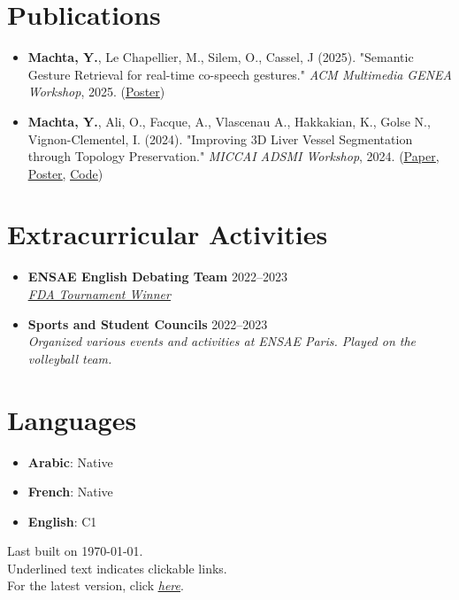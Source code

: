 \documentclass[letterpaper,11pt,twocolumn]{article}
\newcommand{\resumeItem}[1]{\item \small{#1}}
\newcommand{\resumeSubheading}[4]{
	\vspace{-2pt}\item \textbf{#1} \hfill #2 \\
	\textit{\small #3} \hfill \textit{\small #4} 
	\vspace{-7pt}
}
\begin{document}
\section{Publications}
\begin{itemize}[leftmargin=*]
    \resumeItem{\textbf{Machta, Y.}, Le Chapellier, M., Silem, O., Cassel, J (2025). "Semantic Gesture Retrieval for real-time co-speech gestures." \textit{ACM Multimedia GENEA Workshop}, 2025. (\href{https://MachtaYassine.github.io/Papers/GENEA2025-PosterDraft-YMACHTA-ARTICULAB.pdf}{\underline{Poster}})}

	\resumeItem{\textbf{Machta, Y.}, Ali, O., Facque, A., Vlascenau A., Hakkakian, K., Golse N., Vignon-Clementel, I. (2024). "Improving 3D Liver Vessel Segmentation through Topology Preservation." \textit{MICCAI ADSMI Workshop}, 2024. (\href{https://arxiv.org/abs/2411.15778}{\underline{Paper}}, \href{https://MachtaYassine.github.io/Papers/2024_ADSMI_poster.pdf}{\underline{Poster}}, \underline{\href{https://gitlab.inria.fr/simbiotx/LiverVesselSeg}{Code}})}
\end{itemize}

\section{Extracurricular Activities}
\begin{itemize}[leftmargin=*]
	\resumeSubheading
	{ENSAE English Debating Team}{2022--2023}{\href{https://www.frenchdebatingassociation.fr/\#fda}{\underline{FDA Tournament Winner}} }{}
	\resumeSubheading
	{Sports and Student Councils}{2022--2023}{Organized various events and activities at ENSAE Paris. Played on the volleyball team.}{}
\end{itemize}

\section{Languages}
\begin{itemize}[leftmargin=*]
	\item \textbf{Arabic}: Native
	\item \textbf{French}: Native
	\item \textbf{English}: C1
\end{itemize}

\begin{flushright}
	\vspace{-4pt}
	\color{gray}
	Last built on \today.  \\
	Underlined text indicates clickable links. \\
	For the latest version, click \href{https://machtayassine.github.io/resume/resume_ymachta.pdf}{\underline{\textit{here}}}.
\end{flushright}
\end{document}
